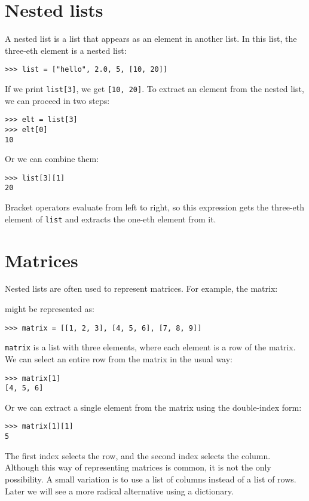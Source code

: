 \section{Nested lists}
\label{nested lists}

A nested list is a list that appears as an element in another
list.  In this list, the three-eth element is a nested list:

\beforeverb
\begin{verbatim}
>>> list = ["hello", 2.0, 5, [10, 20]]
\end{verbatim}
\afterverb
%
If we print {\tt list[3]}, we get {\tt [10, 20]}.  To extract an
element from the nested list, we can proceed in two steps:

\beforeverb
\begin{verbatim}
>>> elt = list[3]
>>> elt[0]
10
\end{verbatim}
\afterverb
%
Or we can combine them:

\beforeverb
\begin{verbatim}
>>> list[3][1]
20
\end{verbatim}
\afterverb
%
Bracket operators evaluate from left to right, so this expression
gets the three-eth element of {\tt list} and extracts the one-eth
element from it.

\section{Matrices}

Nested lists are often used to represent matrices.  For example,
the matrix:

\beforefig
\centerline{}
\afterfig

might be represented as:

\beforeverb
\begin{verbatim}
>>> matrix = [[1, 2, 3], [4, 5, 6], [7, 8, 9]]
\end{verbatim}
\afterverb
%
{\tt matrix} is a list with three elements, where each
element is a row of the matrix.  We can select an entire row from the
matrix in the usual way:

\beforeverb
\begin{verbatim}
>>> matrix[1]
[4, 5, 6]
\end{verbatim}
\afterverb
%
Or we can extract a single element from the matrix using the
double-index form:

\beforeverb
\begin{verbatim}
>>> matrix[1][1]
5
\end{verbatim}
\afterverb
%
The first index selects the row, and the second index selects the
column.  Although this way of representing matrices is common, it is
not the only possibility.  A small variation is to use a list of
columns instead of a list of rows.  Later we will see a more
radical alternative using a dictionary.

